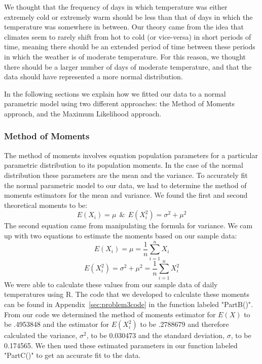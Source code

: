 \documentclass[11pt]{article}
\begin{document}
We thought that the frequency of days in which temperature was either extremely cold or extremely warm should be less than that of days in which the temperature was somewhere in between. Our theory came from the idea that climates seem to rarely shift from hot to cold (or vice-versa) in short periods of time, meaning there should be an extended period of time between these periods in which the weather is of moderate temperature. For this reason, we thought there should be a larger number of days of moderate temperature, and that the data should have represented a more normal distribution. 

In the following sections we explain how we fitted our data to a normal parametric model using two different approaches: the Method of Moments approach, and the Maximum Likelihood approach. 

\subsubsection{Method of Moments}
\label{subsubsec:methodofmoments}
The method of moments involves equation population parameters for a particular parametric distribution to its population moments. In the case of the normal distribution these parameters are the mean and the variance. To accurately fit the normal parametric model to our data, we had to determine the method of moments estimators for the mean and variance. We found the first and second theoretical moments to be: 
\begin{equation}
E(X_i) = \mu\ \ \&\ \ E(X_i^2) = \sigma ^ 2 + \mu ^ 2
\end{equation}
The second equation came from manipulating the formula for variance. We cam up with two equations to estimate the moments based on our sample data:
\begin{equation}
E(X_i) = \mu = \frac{1}{n} \sum_{i=1}^n X_i
\end{equation}
\begin{equation}
E(X_i^2) = \sigma ^ 2 + \mu ^ 2 = \frac{1}{n} \sum_{i=1}^{n} X_i^2
\end{equation}
We were able to calculate these values from our sample data of daily temperatures using R. The code that we developed to calculate these moments can be found in Appendix~\ref{sec:problem3code} in the function labeled "PartB()". From our code we determined the method of moments estimator for $E(X)$ to be .4953848 and the estimator for $E(X_i^2)$ to be .2788679 and therefore calculated the variance, $\sigma^2$, to be 0.030473 and the standard deviation, $\sigma$, to be 0.174565. We then used these estimated parameters in our function labeled "PartC()" to get an accurate fit to the data.
 
\end{document}
